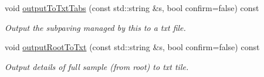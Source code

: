 \begin{DoxyCompactItemize}
void \hyperlink{classsubpavings_1_1AdaptiveHistogramValidation_ac7ad1cd4a9403ae91083dc0ef2356a24}{output\-To\-Txt\-Tabs} (const std\-::string \&s, bool confirm=false) const 
\begin{DoxyCompactList}\small\item\em \-Output the subpaving managed by this to a txt file. \end{DoxyCompactList}\item 
void \hyperlink{classsubpavings_1_1AdaptiveHistogramValidation_a78d5c3ad5e31fc438e0c4cac65e73313}{output\-Root\-To\-Txt} (const std\-::string \&s, bool confirm=false) const 
\begin{DoxyCompactList}\small\item\em \-Output details of full sample (from root) to txt tile. \end{DoxyCompactList}\end{DoxyCompactItemize}

